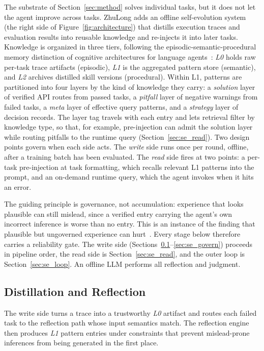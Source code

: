 \documentclass[conference]{IEEEtran}
\begin{document}
The substrate of Section~\ref{sec:method} solves individual tasks, but it does not let the agent improve across tasks. ZhuLong adds an offline self-evolution system (the right side of Figure~\ref{fig:architecture}) that distills execution traces and evaluation results into reusable knowledge and re-injects it into later tasks. Knowledge is organized in three tiers, following the episodic-semantic-procedural memory distinction of cognitive architectures for language agents~\cite{sumers2023cognitive}: \emph{L0} holds raw per-task trace artifacts (episodic), \emph{L1} is the aggregated pattern store (semantic), and \emph{L2} archives distilled skill versions (procedural). Within L1, patterns are partitioned into four layers by the kind of knowledge they carry: a \emph{solution} layer of verified API routes from passed tasks, a \emph{pitfall} layer of negative warnings from failed tasks, a \emph{meta} layer of effective query patterns, and a \emph{strategy} layer of decision records. The layer tag travels with each entry and lets retrieval filter by knowledge type, so that, for example, pre-injection can admit the solution layer while routing pitfalls to the runtime query (Section~\ref{sec:se_read}). Two design points govern when each side acts. The \emph{write} side runs once per round, offline, after a training batch has been evaluated. The \emph{read} side fires at two points: a per-task pre-injection at task formatting, which recalls relevant L1 patterns into the prompt, and an on-demand runtime query, which the agent invokes when it hits an error.

The guiding principle is governance, not accumulation: experience that looks plausible can still mislead, since a verified entry carrying the agent's own incorrect inference is worse than no entry. This is an instance of the finding that plausible but ungoverned experience can hurt~\cite{zhao2024expel,yang2026skillopt}. Every stage below therefore carries a reliability gate. The write side (Sections~\ref{sec:se_distill}--\ref{sec:se_govern}) proceeds in pipeline order, the read side is Section~\ref{sec:se_read}, and the outer loop is Section~\ref{sec:se_loop}. An offline LLM performs all reflection and judgment.

\subsection{Distillation and Reflection}
\label{sec:se_distill}

The write side turns a trace into a trustworthy \emph{L0} artifact and routes each failed task to the reflection path whose input semantics match. The reflection engine then produces \emph{L1} pattern entries under constraints that prevent mislead-prone inferences from being generated in the first place.
\end{document}
